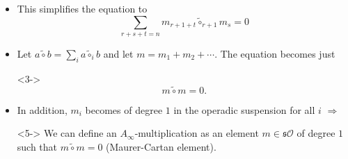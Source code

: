 \documentclass{beamer}
\theoremstyle{definition}
\begin{document}
\begin{frame}
\begin{itemize}
\item<1-> This simplifies the equation to
\[\sum_{r+s+t=n}m_{r+1+t}\tilde{\circ}_{r+1}m_s=0\] %
\item<2-> Let $a\tilde{\circ}b=\sum_{i}a\tilde{\circ}_ib$ and let $m=m_1+m_2+\cdots$. The equation becomes just
\item[]<3-> \[m\tilde{\circ}m=0.\]
\item<4-> In addition, $m_i$ becomes of degree $1$ in the operadic suspension for all $i$ $\Rightarrow$
\item[]<5-> We can define an $A_\infty$-multiplication as an element $m\in\mathfrak{s}\mathcal{O}$ of degree $1$ such that $m\tilde{\circ}m=0$ (Maurer-Cartan element). 
\end{itemize}
\end{frame}
\end{document}
